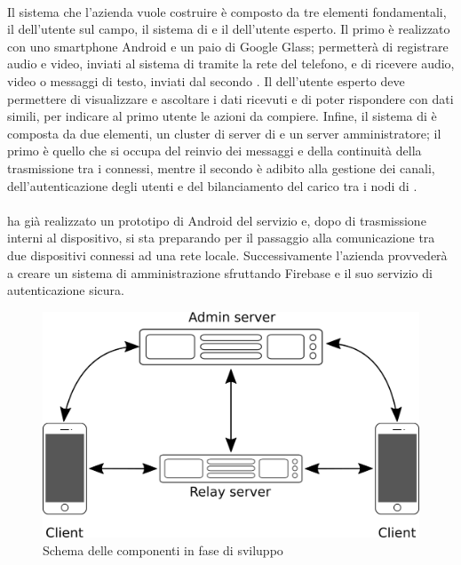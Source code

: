    \paragraph*{} Il sistema che l'azienda vuole costruire è composto da tre elementi fondamentali, il  dell'utente sul campo, il sistema di  e il  dell'utente esperto. Il primo è realizzato con uno smartphone Android e un paio di Google Glass; permetterà di registrare audio e video, inviati al sistema di  tramite la rete del telefono, e di ricevere audio, video o messaggi di testo, inviati dal secondo . Il  dell'utente esperto deve permettere di visualizzare e ascoltare i dati ricevuti e di poter rispondere con dati simili, per indicare al primo utente le azioni da compiere. Infine, il sistema di  è composta da due elementi, un cluster di server di  e un server amministratore; il primo è quello che si occupa del reinvio dei messaggi e della continuità della trasmissione tra i  connessi, mentre il secondo è adibito alla gestione dei canali, dell'autenticazione degli utenti e del bilanciamento del carico tra i nodi di .
   \paragraph*{}
   \nomeAzienda{} ha già realizzato un prototipo di  Android del servizio e, dopo  di trasmissione interni al dispositivo, si sta preparando per il passaggio alla comunicazione tra due dispositivi connessi ad una rete locale. Successivamente l'azienda provvederà a creare un sistema di amministrazione sfruttando Firebase e il suo servizio di autenticazione sicura.
   \begin{figure}[H]
      \begin{center}
         \includegraphics[width=12cm,keepaspectratio]{immagini/erastreaming-schema-attuale}
      \end{center}
      \caption{Schema delle componenti in fase di sviluppo}
   \end{figure}
